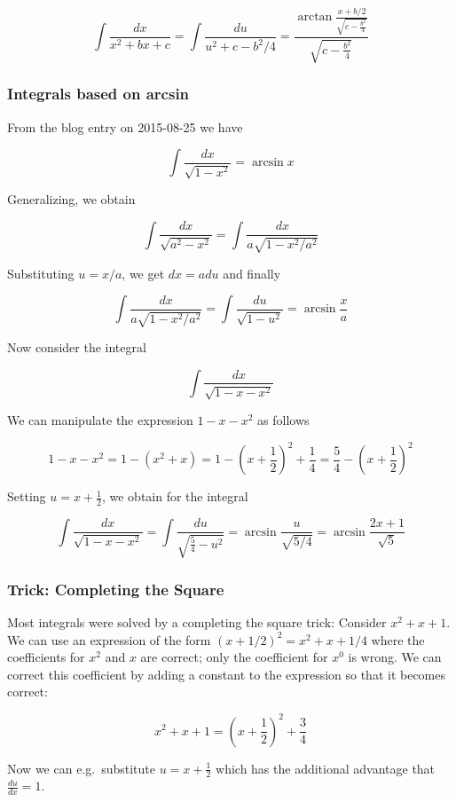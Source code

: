 \[ \int\frac{dx}{x^2+bx+c} = \int \frac{du}{u^2 + c - b^2/4} = \frac{\arctan \frac{x+b/2}{\sqrt{c-\frac{b^2}{4}}}}{\sqrt{c-\frac{b^2}{4}}}\]

\subsubsection{Integrals based on arcsin}

From the blog entry on 2015-08-25 we have

\[\int \frac{dx}{\sqrt{1-x^2}} = \arcsin x\]

Generalizing, we obtain

\[\int \frac{dx}{\sqrt{a^2-x^2}} = \int \frac{dx}{a\sqrt{1-x^2/a^2}} \]

Substituting $u=x/a$, we get $dx = a du$ and finally

\[\int \frac{dx}{a\sqrt{1-x^2/a^2}} = \int \frac{du}{\sqrt{1-u^2}} = \arcsin \frac{x}{a}\]

Now consider the integral

\[ \int \frac{dx}{\sqrt{1-x-x^2}} \]

We can manipulate the expression
$1-x-x^2$ as follows

\[1-x-x^2= 1-(x^2+x) = 1-\left(x+\frac{1}{2}\right)^2+\frac{1}{4} = \frac{5}{4} - \left( x+\frac{1}{2} \right)^2\]

Setting $u=x+\frac{1}{2}$, we obtain for the integral

\[ \int \frac{dx}{\sqrt{1-x-x^2}} = \int \frac{du}{\sqrt{\frac{5}{4} - u^2}} = \arcsin \frac{u}{\sqrt{5/4}} = \arcsin \frac{2x+1}{\sqrt{5}}\]

\subsubsection{Trick: Completing the Square}

Most integrals were solved by a completing the square trick: Consider $x^2+x+1$. We can use an expression of the form $(x+1/2)^2 = x^2 + x + 1/4$ where the coefficients for $x^2$ and
$x$ are correct; only the coefficient for $x^0$ is wrong. We can correct this coefficient by adding a constant to the expression so that it becomes correct:

\[ x^2+x+1 = \left(x+\frac{1}{2}\right)^2 + \frac{3}{4} \]

Now we can e.g.~substitute $u=x+\frac{1}{2}$ which has the
additional advantage that $\frac{du}{dx} = 1$.
